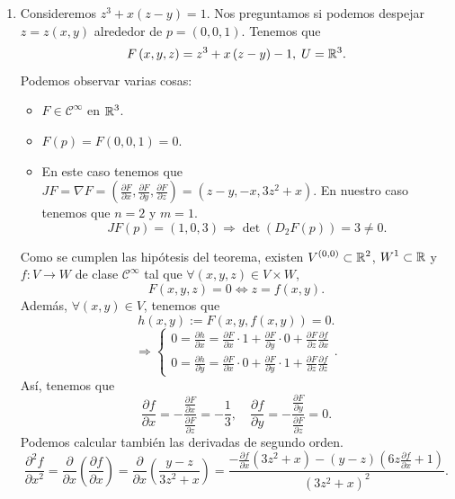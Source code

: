 \begin{eg}
\begin{enumerate}
\item Consideremos $\displaystyle z^{3}+x\left(z-y\right) = 1 $. Nos preguntamos si podemos despejar $\displaystyle z = z\left(x,y\right) $ alrededor de $\displaystyle p = \left(0,0,1\right) $. Tenemos que 
	\[F\left(x,y,z\right) = z^{3}+x\left(z-y\right)-1, \; U = \mathbb{R}^{3} .\]
Podemos observar varias cosas:
\begin{itemize}
\item $\displaystyle F \in \mathcal{C}^{\infty} $ en $\displaystyle \mathbb{R}^{3} $.
\item $\displaystyle F\left(p\right) = F\left(0,0,1\right) = 0 $.
\item En este caso tenemos que $\displaystyle JF = \nabla F = \left(\frac{\partial F}{\partial x}, \frac{\partial F}{\partial y}, \frac{\partial F}{\partial z}\right) = \left(z-y, -x, 3z^{2}+x\right)$. En nuestro caso tenemos que $\displaystyle n = 2 $ y $\displaystyle m = 1 $. 
	\[JF\left(p\right) = \left(1,0,3\right) \Rightarrow \det\left(D_{2}F\left(p\right)\right) = 3 \neq 0 .\]
\end{itemize}
Como se cumplen las hipótesis del teorema, existen $\displaystyle V^{\left(0,0\right)} \subset \mathbb{R}^{2} $, $\displaystyle W^{1} \subset \mathbb{R} $ y $\displaystyle f : V \to W $ de clase $\displaystyle \mathcal{C}^{\infty} $ tal que $\displaystyle \forall \left(x,y,z\right) \in V \times W $,
\[F\left(x,y,z\right) = 0 \iff z = f\left(x,y\right) .\]
Además, $\displaystyle \forall \left(x,y\right) \in V $, tenemos que 
\[h\left(x,y\right) := F\left(x,y,f\left(x,y\right)\right) = 0 .\]
\[\Rightarrow 
\begin{cases}
0 = \frac{\partial h}{\partial x} = \frac{\partial F}{\partial x} \cdot 1 + \frac{\partial F}{\partial y} \cdot 0 + \frac{\partial F}{\partial z}\frac{\partial f}{\partial x} \\
0 = \frac{\partial h}{\partial y} = \frac{\partial F}{\partial x} \cdot 0 + \frac{\partial F}{\partial y} \cdot 1 + \frac{\partial F}{\partial z}\frac{\partial f}{\partial z}
\end{cases}
.\]
Así, tenemos que 
\[\frac{\partial f}{\partial x} = - \frac{\frac{\partial F}{\partial x}}{\frac{\partial F}{\partial z}} = -\frac{1}{3}, \quad \frac{\partial f}{\partial y}= - \frac{\frac{\partial F}{\partial y}}{\frac{\partial F}{\partial z}} = 0 .\]
Podemos calcular también las derivadas de segundo orden. 
\[\frac{\partial^{2}f}{\partial x^{2}} = \frac{\partial }{\partial x}\left(\frac{\partial f}{\partial x}\right) = \frac{\partial }{\partial x}\left(\frac{y-z}{3z^{2}+x}\right) = \frac{-\frac{\partial f}{\partial x}\left(3z^{2}+x\right)-\left(y-z\right)\left(6z\frac{\partial f}{\partial x}+1\right)}{\left(3z^{2}+x\right)^{2}}  .\]

\end{enumerate}
\end{eg}
